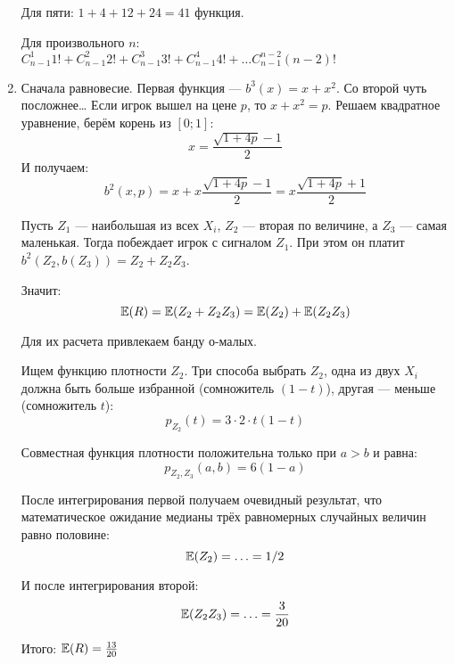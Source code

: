 \begin{enumerate}
Для пяти: $1+4+12+24=41$ функция.

Для произвольного $ n $: $ C_{n-1}^{1}1!+C_{n-1}^{2}2!+C_{n-1}^{3}3!+C_{n-1}^{4}4!+\ldots C_{n-1}^{n-2}(n-2)! $


\item Сначала равновесие. Первая функция — $ b^{3}(x)=x+x^{2} $. Со второй чуть посложнее\ldots
Если игрок вышел на цене $ p $, то $ x+x^{2}=p $. Решаем квадратное уравнение, берём корень из $ [0;1] $:
\begin{equation}
x=\frac{\sqrt{1+4p}-1}{2}
\end{equation}
И получаем:
\begin{equation}
b^{2}(x,p)=x+x\frac{\sqrt{1+4p}-1}{2}=x\frac{\sqrt{1+4p}+1}{2}
\end{equation}

Пусть $ Z_{1} $ — наибольшая из всех $ X_{i} $, $ Z_{2} $ — вторая по величине, а $ Z_{3} $ — самая маленькая. Тогда побеждает игрок с сигналом $ Z_{1} $. При этом он платит $ b^{2}(Z_{2},b(Z_{3}))=Z_{2}+Z_{2}Z_{3} $.

Значит:
\begin{equation}
\mathbb{E}(R)=\mathbb{E}(Z_{2}+Z_{2}Z_{3})=\mathbb{E}(Z_{2})+\mathbb{E}(Z_{2}Z_{3})
\end{equation}

Для их расчета привлекаем банду о-малых.


Ищем функцию плотности $ Z_{2} $. Три способа выбрать $ Z_{2} $, одна из двух $ X_{i} $ должна быть больше избранной (сомножитель $ (1-t) $), другая — меньше (сомножитель $ t $):
\begin{equation}
p_{Z_{2}}(t)=3\cdot 2\cdot t(1-t)
\end{equation}

Совместная функция плотности положительна только при $ a>b $ и равна:
\begin{equation}
p_{Z_{2},Z_{3}}(a,b)=6(1-a)
\end{equation}

После интегрирования первой получаем очевидный результат, что математическое ожидание медианы трёх равномерных случайных величин равно половине:
\begin{equation}
\mathbb{E}(Z_{2})=\ldots=1/2
\end{equation}

И после интегрирования второй:
\begin{equation}
\mathbb{E}(Z_{2}Z_{3})=\ldots=\frac{3}{20}
\end{equation}

Итого: $ \mathbb{E}(R)=\frac{13}{20} $


\end{enumerate}
